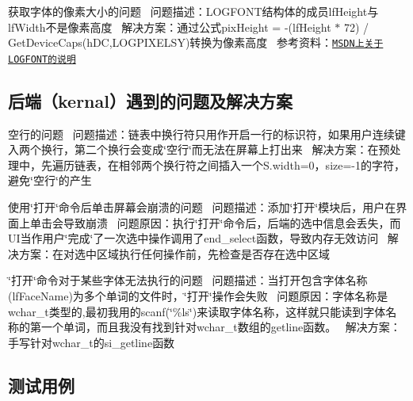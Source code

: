 \begin{DoxyEnumerate}
\item 获取字体的像素大小的问题~\newline
问题描述：{\ttfamily L\+O\+G\+F\+O\+NT}结构体的成员{\ttfamily lf\+Height}与{\ttfamily lf\+Width}不是像素高度~\newline
解决方案：通过公式{\ttfamily pix\+Height = -\/(lf\+Height $\ast$ 72) / Get\+Device\+Caps(h\+D\+C,\+L\+O\+G\+P\+I\+X\+E\+L\+S\+Y)}转换为像素高度~\newline
参考资料：\href{https://msdn.microsoft.com/zh-cn/library/bb773327.aspx}{\tt M\+S\+D\+N上关于\+L\+O\+G\+F\+O\+N\+T的说明}~\newline

\end{DoxyEnumerate}

\subsection*{后端（kernal）遇到的问题及解决方案 }


\begin{DoxyEnumerate}
\item 空行的问题~\newline
问题描述：链表中换行符只用作开启一行的标识符，如果用户连续键入两个换行，第二个换行会变成\char`\"{}空行\char`\"{}而无法在屏幕上打出来~\newline
解决方案：在预处理中，先遍历链表，在相邻两个换行符之间插入一个{\ttfamily S.\+width}=0，{\ttfamily size}=-\/1的字符，避免\char`\"{}空行\char`\"{}的产生~\newline

\item 使用\char`\"{}打开\char`\"{}命令后单击屏幕会崩溃的问题~\newline
问题描述：添加\char`\"{}打开\char`\"{}模块后，用户在界面上单击会导致崩溃~\newline
问题原因：执行\char`\"{}打开\char`\"{}命令后，后端的选中信息会丢失，而\+U\+I当作用户\char`\"{}完成\char`\"{}了一次选中操作调用了{\ttfamily end\+\_\+select}函数，导致内存无效访问~\newline
解决方案：在对选中区域执行任何操作前，先检查是否存在选中区域~\newline

\item \char`\"{}打开\char`\"{}命令对于某些字体无法执行的问题~\newline
问题描述：当打开包含字体名称({\ttfamily lf\+Face\+Name})为多个单词的文件时，\char`\"{}打开\char`\"{}操作会失败~\newline
问题原因：字体名称是{\ttfamily wchar\+\_\+t}类型的,最初我用的scanf(\char`\"{}\%ls\char`\"{})来读取字体名称，这样就只能读到字体名称的第一个单词，而且我没有找到针对{\ttfamily wchar\+\_\+t}数组的getline函数。~\newline
解决方案：手写针对{\ttfamily wchar\+\_\+t}的{\ttfamily si\+\_\+getline}函数~\newline
 \subsection*{测试用例 }
\end{DoxyEnumerate}


